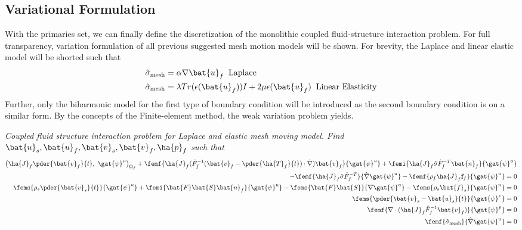 \subsection{Variational Formulation}
With the primaries set, we can finally define the discretization of the monolithic coupled fluid-structure interaction problem. For full transparency, variation formulation of all previous suggested mesh motion models will be shown. For brevity, the Laplace and linear elastic model will be shorted such that 
\begin{align*}
&\hat{\sigma}_{\text{mesh}} = \alpha \nabla \bat{u}_f \hspace{2mm} \text{Laplace} \\
&\hat{\sigma}_{\text{mesh}} =  \lambda Tr(\epsilon(\bat{u}_f)) I + 2 \mu \epsilon(\bat{u}_f) \hspace{2mm} \text{Linear Elasticity} 
\end{align*}
Further, only the biharmonic model for the first type of boundary condition will be introduced as the second boundary condition is on a similar form.
  By the concepts of the Finite-element method, the weak variation problem yields.

\begin{prob}
\textit{Coupled fluid structure interaction problem for Laplace and elastic mesh moving model.
Find $\bat{u}_s, \bat{u}_f, \bat{v}_s, \bat{v}_f, \ha{p}_f $ such that}
\begin{align*}
\big(\ha{J}_f \pder{\bat{v}_f}{t}, \ \gat{\psi}^u \big)_{\hat{\Omega}_f} +
\femf{\ha{J}_f (\hat{F}_f^{-1}(\bat{v}_f - \pder{\ha{T}_f}{t}) \cdot \hat{\nabla}) \bat{v}_f}{\gat{\psi}^u}
+ \femi{\ha{J}_f \hat{\sigma}\hat{F}_f^{-T} \bat{n}_f}{\gat{\psi}^u} \\
- \femf{\ha{J}_f \hat{\sigma}\hat{F}_f^{-T}}{\hat{\nabla}\gat{\psi}^u} -
\femf{\rho_f \ha{J}_f \mathbf{f}_f}{{\gat{\psi}^u}} = 0 \\
\fems{\rho_s \pder{\bat{v}_s}{t}}{\gat{\psi}^u} + \femi{\bat{F}\bat{S}\bat{n}_f}{\gat{\psi}^u}
- \fems{\bat{F}\bat{S}}{\nabla \gat{\psi}^u} - \fems{\rho_s \bat{f}_s}{\gat{\psi}^u} = 0 \\
\fems{\pder{\bat{v}_s - \bat{u}_s}{t}}{\gat{\psi}^v}  = 0\\
\femf{\nabla \cdot (\ha{J}_f \hat{F}_f^{-1} \bat{v}_f)}{\gat{\psi}^p} = 0 \\
\femf{\hat{\sigma}_{\text{mesh}}}{\hat{\nabla}\gat{\psi}^u} = 0
\end{align*} 
\end{prob}

